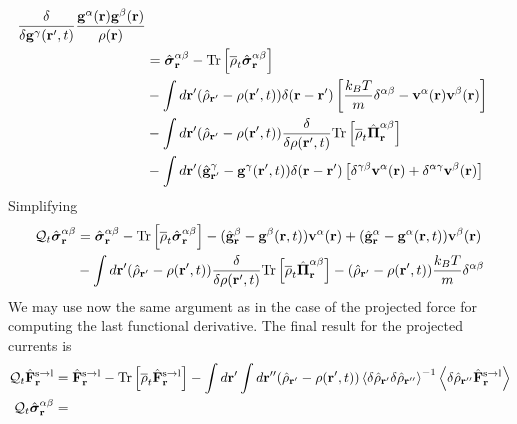 \documentclass[b5paper,openright,11pt]{book}
\newcommand{\llangle}{\left\langle}
\newcommand{\rrangle}{\right\rangle}
\begin{document}
\begin{appendices}
\begin{align}
\frac{\delta}{\delta {\bf g}^\gamma({\bf r}',t)}
\frac{{\bf g}^\alpha({\bf r}){\bf g}^\beta({\bf r})}{\rho({\bf r})}
\nonumber\\
&=
\hat{\boldsymbol{\sigma}}^{\alpha\beta}_{{\bf r}}-{\rm Tr}\left[\overline{\rho}_t\hat{\boldsymbol{\sigma}}^{\alpha\beta}_{{\bf r}}\right]
\nonumber\\
&-\int d{\bf r}'(\hat{\rho}_{{\bf r}'}-\rho({\bf r}',t))
\delta({\bf r}-{\bf r}') \left[\frac{k_BT}{m}\delta^{\alpha\beta}-{\bf v}^\alpha({\bf r}){\bf v}^\beta({\bf r})\right]
\nonumber\\
&-\int d{\bf r}'(\hat{\rho}_{{\bf r}'}-\rho({\bf r}',t))
\frac{\delta}{\delta \rho({\bf r}',t)}
{\rm Tr}\left[\overline{\rho}_{t} \hat{\boldsymbol{\Pi}}^{\alpha\beta}_{{\bf r}}\right]
\nonumber\\
&-\int d{\bf r}'(\hat{\bf g}^\gamma_{{\bf r}'}-{\bf g}^\gamma({\bf r}',t))\delta({\bf r}-{\bf r}')
\left[\delta^{\gamma\beta}{\bf v}^\alpha({\bf r})+\delta^{\alpha\gamma}{\bf v}^\beta({\bf r})\right]
\label{QS2}
\end{align}
Simplifying
\begin{align}
  {\cal Q}_t\hat{\boldsymbol{\sigma}}^{\alpha\beta}_{{\bf r}}&=
\hat{\boldsymbol{\sigma}}^{\alpha\beta}_{{\bf r}}-{\rm Tr}\left[\overline{\rho}_t\hat{\boldsymbol{\sigma}}^{\alpha\beta}_{{\bf r}}\right]
-(\hat{\bf g}^\beta_{{\bf r}}-{\bf g}^\beta({\bf r},t))
{\bf v}^\alpha({\bf r})+
(\hat{\bf g}^\alpha_{{\bf r}}-{\bf g}^\alpha({\bf r},t))
{\bf v}^\beta({\bf r})
\nonumber\\
&-\int d{\bf r}'(\hat{\rho}_{{\bf r}'}-\rho({\bf r}',t))
\frac{\delta}{\delta \rho({\bf r}',t)}
{\rm Tr}\left[\overline{\rho}_{t} \hat{\boldsymbol{\Pi}}^{\alpha\beta}_{{\bf r}}\right]
-(\hat{\rho}_{{\bf r}'}-\rho({\bf r}',t))\frac{k_BT}{m}\delta^{\alpha\beta}
\label{QS3}
\end{align}
We may use now the same argument as in the case of the projected force
for computing the last functional derivative. The final result for the
projected currents is
\begin{align}
    {\cal Q}_t\hat{\bf F}^{\rm s\to l}_{{\bf r}}&=
\hat{\bf F}^{\rm s\to l}_{{\bf r}}- {\rm Tr}\left[\overline{\rho}_{t} \hat{\bf F}^{\rm s\to l}_{{\bf r}}\right]
-\int d{\bf r}'\int d{\bf r}''(\hat{\rho}_{{\bf r}'}-{\rho}({\bf r}',t))
\llangle \delta\hat{\rho}_{{\bf r}'}\delta\hat{\rho}_{{\bf r}''}\rrangle^{-1}
\llangle \delta \hat{\rho}_{{\bf r}''}\hat{\bf F}^{\rm s\to l}_{{\bf r}}\rrangle
\nonumber\\
  {\cal Q}_t\hat{\boldsymbol{\sigma}}^{\alpha\beta}_{{\bf r}}&=

\end{align}
\end{appendices}
\end{document}
